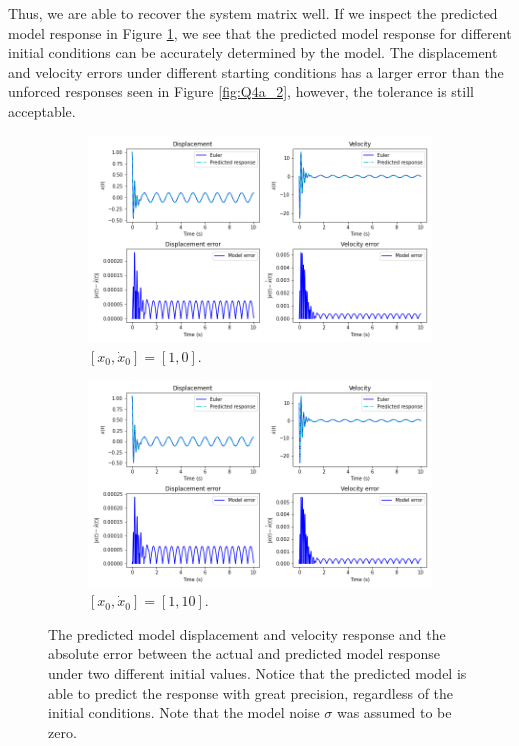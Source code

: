 \documentclass{article}
\begin{document}
Thus, we are able to recover the system matrix well. If we inspect the predicted model response in Figure \ref{fig:Q4b_2}, we see that the predicted model response for different initial conditions can be accurately determined by the model. The displacement and velocity errors under different starting conditions has a larger error than the unforced responses seen in Figure \ref{fig:Q4a_2}, however, the tolerance is still acceptable.
\begin{figure}[!htb]
     \centering
     \begin{subfigure}[b]{0.49\textwidth}
         \centering
         \includegraphics[width=\textwidth]{Q4b_fig2.png}
         \caption{$[x_0, \dot{x}_0] = [1, 0]$.}
     \end{subfigure}
     \hfill
     \begin{subfigure}[b]{0.49\textwidth}
         \centering
         \includegraphics[width=\textwidth]{Q4b_fig2_1.png}
         \caption{$[x_0, \dot{x}_0] = [1, 10]$.}
     \end{subfigure}
        \caption{The predicted model displacement and velocity response and the absolute error between the actual and predicted model response under two different initial values. Notice that the predicted model is able to predict the response with great precision, regardless of the initial conditions. Note that the model noise $\sigma$ was assumed to be zero.}
        \label{fig:Q4b_2}
\end{figure}
\end{document}
